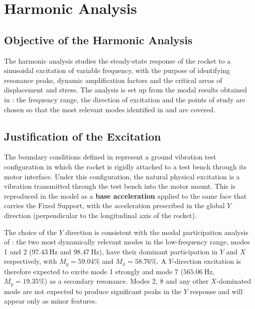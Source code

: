 \section{Harmonic Analysis}
\label{sec:harmonic_analysis}

\subsection{Objective of the Harmonic Analysis}

The harmonic analysis studies the steady-state response of the rocket to a sinusoidal excitation of variable frequency, with the purpose of identifying resonance peaks, dynamic amplification factors and the critical areas of displacement and stress. The analysis is set up from the modal results obtained in : the frequency range, the direction of excitation and the points of study are chosen so that the most relevant modes identified in  and  are covered.

\subsection{Justification of the Excitation}

The boundary conditions defined in  represent a ground vibration test configuration in which the rocket is rigidly attached to a test bench through its motor interface. Under this configuration, the natural physical excitation is a vibration transmitted through the test bench into the motor mount. This is reproduced in the model as a \textbf{base acceleration} applied to the same face that carries the Fixed Support, with the acceleration prescribed in the global $Y$ direction (perpendicular to the longitudinal axis of the rocket).

The choice of the $Y$ direction is consistent with the modal participation analysis of : the two most dynamically relevant modes in the low-frequency range, modes 1 and 2 ($\SI{97.43}{\hertz}$ and $\SI{98.47}{\hertz}$), have their dominant participation in $Y$ and $X$ respectively, with $M_y = 59.04\%$ and $M_x = 58.76\%$. A $Y$-direction excitation is therefore expected to excite mode 1 strongly and mode 7 ($\SI{565.06}{\hertz}$, $M_y = 19.35\%$) as a secondary resonance. Modes 2, 8 and any other $X$-dominated mode are not expected to produce significant peaks in the $Y$ response and will appear only as minor features.

